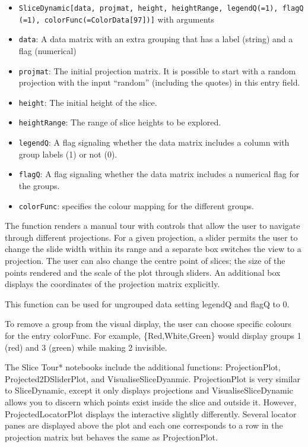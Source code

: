 \documentclass[]{interact}
\theoremstyle{plain}%
\theoremstyle{definition}
\theoremstyle{remark}
\begin{document}
\begin{itemize}
\item
  \texttt{SliceDynamic{[}data,\ projmat,\ height,\ heightRange,\ legendQ(=1),\ flagQ(=1),\ colorFunc(=ColorData{[}97{]}){]}}
  with arguments
\item
  \texttt{data}: A data matrix with an extra grouping that has a label
  (string) and a flag (numerical)
\item
  \texttt{projmat}: The initial projection matrix. It is possible to
  start with a random projection with the input ``random'' (including
  the quotes) in this entry field.
\item
  \texttt{height}: The initial height of the slice.
\item
  \texttt{heightRange}: The range of slice heights to be explored.
\item
  \texttt{legendQ}: A flag signaling whether the data matrix includes a
  column with group labels (1) or not (0).
\item
  \texttt{flagQ}: A flag signaling whether the data matrix includes a
  numerical flag for the groups.
\item
  \texttt{colorFunc}: specifies the colour mapping for the different
  groups.
\end{itemize}

The function renders a manual tour with controls that allow the user to
navigate through different projections. For a given projection, a slider
permits the user to change the slide width within its range and a
separate box switches the view to a projection. The user can also change
the centre point of slices; the size of the points rendered and the
scale of the plot through sliders. An additional box displays the
coordinates of the projection matrix explicitly.

This function can be used for ungrouped data setting legendQ and flagQ
to 0.

To remove a group from the visual display, the user can choose specific
colours for the entry colorFunc. For example, \{Red,White,Green\} would
display groups 1 (red) and 3 (green) while making 2 invisible.

The Slice Tour* notebooks include the additional functions:
ProjectionPlot, Projected2DSliderPlot, and VisualiseSliceDyanmic.
ProjectionPlot is very similar to SliceDynamic, except it only displays
projections and VisualiseSliceDynamic allows you to discern which points
exist inside the slice and outside it. However, ProjectedLocatorPlot
displays the interactive slightly differently. Several locator panes are
displayed above the plot and each one corresponds to a row in the
projection matrix but behaves the same as ProjectionPlot.
\end{document}
